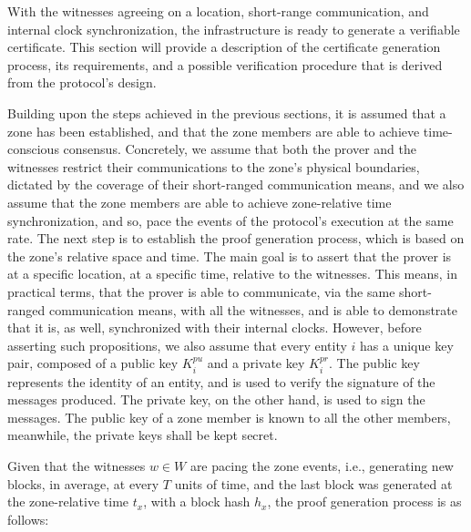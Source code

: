 With the witnesses agreeing on a location, short-range communication, and internal clock synchronization, the infrastructure is ready to generate a verifiable \pol{} certificate. This section will provide a description of the certificate generation process, its requirements, and a possible verification procedure that is derived from the protocol's design. 

Building upon the steps achieved in the previous sections, it is assumed that a zone has been established, and that the zone members are able to achieve time-conscious consensus. Concretely, we assume that both the prover and the witnesses restrict their communications to the zone's physical boundaries, dictated by the coverage of their short-ranged communication means, and we also assume that the zone members are able to achieve zone-relative time synchronization, and so, pace the events of the protocol's execution at the same rate. The next step is to establish the proof generation process, which is based on the zone's relative space and time. The main goal is to assert that the prover is at a specific location, at a specific time, relative to the witnesses. This means, in practical terms, that the prover is able to communicate, via the same short-ranged communication means, with all the witnesses, and is able to demonstrate that it is, as well, synchronized with their internal clocks. However, before asserting such propositions, we also assume that every entity $i$ has a unique key pair, composed of a public key $K^{pu}_i$ and a private key $K^{pr}_i$. The public key represents the identity of an entity, and is used to verify the signature of the messages produced. The private key, on the other hand, is used to sign the messages. The public key of a zone member is known to all the other members, meanwhile, the private keys shall be kept secret. 

Given that the witnesses $w \in W$ are pacing the zone events, i.e., generating new blocks, in average, at every $T$ units of time, and the last block was generated at the zone-relative time $t_x$, with a block hash $h_x$, the proof generation process is as follows:

